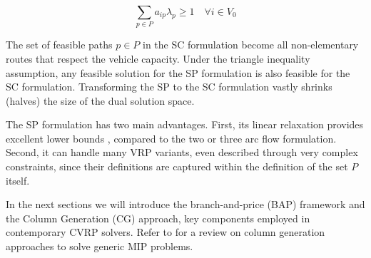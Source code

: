 \begin{equation}\label{eq:set-covering-customers-visited-by-exactly-one-route}
	\sum_{p \in P}  a_{ip} \lambda_p \ge 1  \quad \forall i \in V_0
\end{equation}

The set of feasible paths $p \in P$ in the SC formulation
become all non-elementary routes that respect the vehicle capacity.
Under the triangle inequality assumption,
any feasible solution for the SP formulation is also feasible for the SC formulation.
Transforming the SP to the SC formulation vastly shrinks (halves) the size of the dual solution space.

\medskip

The SP formulation has two main advantages.
First, its linear relaxation provides excellent lower bounds \parencite{bramel1997},
compared to the two or three arc flow formulation.
Second, it can handle many VRP variants,
even described through very complex constraints,
since their definitions are captured within the definition of the set $P$ itself.

\medskip

In the next sections we will introduce
the branch-and-price (BAP) framework and the Column Generation (CG) approach,
key components employed in contemporary CVRP solvers.
Refer to \textcite{vanderbeck2005, lubbecke2005} for a review on column generation
approaches to solve generic MIP problems.
